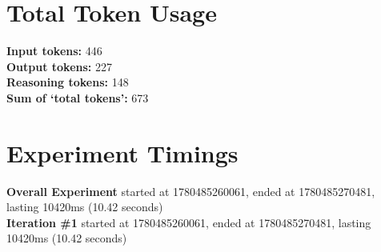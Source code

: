 \documentclass{article}
\begin{document}
\section*{Total Token Usage}
\textbf{Input tokens: }446
\\\textbf{Output tokens: }227
\\\textbf{Reasoning tokens: }148
\\\textbf{Sum of `total tokens': }673
\section*{Experiment Timings}
\textbf{Overall Experiment} started at 1780485260061, ended at 1780485270481, lasting 10420ms (10.42 seconds)
\\\textbf{Iteration \#1} started at 1780485260061, ended at 1780485270481, lasting 10420ms (10.42 seconds)
\end{document}
